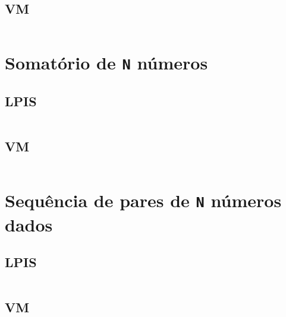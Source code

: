 \subsection{VM}
\begin{longlisting}
	\inputminted{text}{testes/testesPedidos/01ass.txt}
	
\end{longlisting}



\section{Somatório de \texttt{N} números}
\label{appendix:d:sec:d2}
\subsection{LPIS}
\begin{longlisting}
	\inputminted{text}{testes/testesPedidos/02codLpis.txt}
	
\end{longlisting}


\subsection{VM}
\begin{longlisting}
	\inputminted{text}{testes/testesPedidos/02ass.txt}
	
\end{longlisting}


\section{Sequência de pares de \texttt{N} números dados}
\label{appendix:d:sec:d3}
\subsection{LPIS}
\begin{longlisting}
	\inputminted{text}{testes/testesPedidos/03codLpis.txt}
	
\end{longlisting}

\subsection{VM}
\begin{longlisting}
	\inputminted{text}{testes/testesPedidos/03ass.txt}
	
\end{longlisting}




